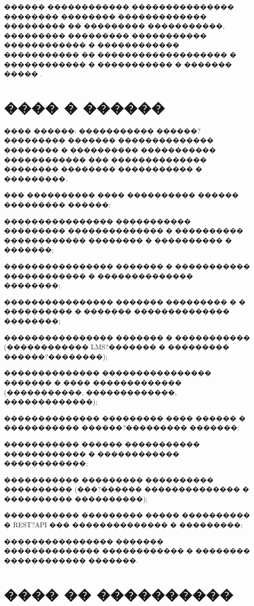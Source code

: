 \documentclass{G7-32}
\begin{document}
������ ������������ ��������������� �������� �������� ������������� ��������� �� ��������� �����������, ��������� ��������� ����������� ������������ � ������������ ����������� �� ������������������� � ������������ � ����������� � ������� ����� \cite{adaptive-edu,multi-tenant-guide}.

\section{���� � ������}

���� ������: ����������� ������?��������� ������� �������������� �������� � ���������� ����������� ������������ ��� �������������� �������� �������� ����������� � ���������.

��� ���������� ���� ���������� ������ ��������� ������:

\begin{compactlist}
  \item ���������������� ����������� ��������� �������������� � ���������� ������������ �������� � ���������� � �������;
  \item ���������������� ������� � ����������� ������������ � �������������� ��������;
  \item ���������������� ������� ��������� � � ���������� � ������� �������������� ��������;
  \item ���������������� ������� � ����������� (������������ LMS?������� � ��������� ������?��������);
  \item �������������� ���������������� ������� � ���� ������������� (�����������, �������������, �������������);
  \item �������������� ��������� ���� ������ � ����������� ������?��������� �������;
  \item ����������� ������ ����������� ������������ � ������������ ������������;
  \item ����������� ��������� ���������� ���������� (���?������ �������������� � ���������� ����������);
  \item ����������� ��������� ����� ���������� � REST?API ��� �������������� � ���������;
  \item ���������������� ������� �������������� ������������ � �������� ������������ �������.
\end{compactlist}

\section{���� �� ����������}
\end{document}
